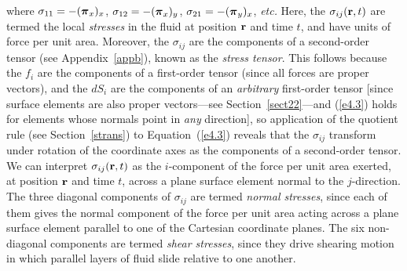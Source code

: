  where $\sigma_{11}= -(\mbox{\boldmath$\pi$}_x)_x$, $\sigma_{12} = -(\mbox{\boldmath$\pi$}_x)_y$, $\sigma_{21}=-(\mbox{\boldmath$\pi$}_y)_x$, {\em etc.}
 Here, the $\sigma_{ij}({\bf r}, t)$ are termed the local {\em stresses}\/ in the fluid at position ${\bf r}$ and
 time $t$, and have units of force per unit area. Moreover, the $\sigma_{ij}$ are
 the components of a second-order tensor (see Appendix~\ref{appb}), known as the {\em stress tensor}. This follows because the $f_i$ are the components of a first-order tensor (since all forces are proper vectors), and the $dS_i$ are the components of an {\em arbitrary}\/ first-order tensor [since surface elements are
 also proper vectors---see Section~\ref{sect22}---and (\ref{e4.3}) holds for
  elements whose normals point in {\em any}\/ direction], so application of  the quotient rule (see Section~\ref{strans}) to Equation~(\ref{e4.3}) reveals that the  $\sigma_{ij}$  transform under rotation of the coordinate axes as the components of a second-order tensor. We can interpret $\sigma_{ij}({\bf r},t)$
 as the $i$-component of the force per unit area exerted, at position ${\bf r}$ and time $t$, across a plane surface element normal to the
 $j$-direction. The three diagonal components of $\sigma_{ij}$ are
 termed {\em normal stresses}, since each of them gives the normal component of the  force per unit area acting
 across a plane surface element parallel to one of the Cartesian coordinate planes. The six non-diagonal components
 are termed {\em shear stresses}, since they drive shearing motion in which parallel
 layers of fluid slide relative to one another.
 
